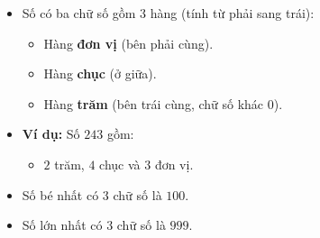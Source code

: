 \documentclass[10pt,a4paper]{article}
\begin{document}
\noindent
\begin{minipage}[t]{0.49\textwidth}\vspace{0pt}
\begin{tcolorbox}[
  enhanced,
  colback=violet!4!white,
  colframe=violet!75!black,
  arc=2mm, boxrule=0.8pt,
  left=2mm, right=2mm, top=1.8mm, bottom=1.8mm,
  title={\footnotesize\bfseries\color{white}\faKey\ 1. Cấu tạo số có ba chữ số}
]
{\footnotesize
\begin{itemize}\setlength{\itemsep}{1pt}\setlength{\leftskip}{-2.5mm}
  \item Số có ba chữ số gồm 3 hàng (tính từ phải sang trái):
  \begin{itemize}\setlength{\itemsep}{0.5pt}\setlength{\leftskip}{-2mm}
    \item Hàng \textbf{đơn vị} (bên phải cùng).
    \item Hàng \textbf{chục} (ở giữa).
    \item Hàng \textbf{trăm} (bên trái cùng, chữ số khác $0$).
  \end{itemize}
  \item \textbf{Ví dụ:} Số $243$ gồm:
  \begin{itemize}\setlength{\itemsep}{0.5pt}\setlength{\leftskip}{-2mm}
    \item $2$ trăm, $4$ chục và $3$ đơn vị.
  \end{itemize}
  \item Số bé nhất có 3 chữ số là \textbf{$100$}.
  \item Số lớn nhất có 3 chữ số là \textbf{$999$}.
\end{itemize}
}
\end{tcolorbox}
\end{minipage}
\hfill
\end{document}
